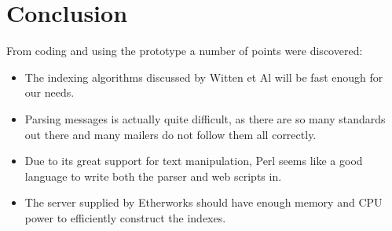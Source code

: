 \pagebreak
\enlargethispage*{0.5cm}
\section{Conclusion}
From coding and using the prototype a number of points were discovered:

\begin{itemize}
\item The indexing algorithms discussed by Witten et Al will be fast enough for our needs.
\item Parsing messages is actually quite difficult, as there are so many standards out there and many mailers do not follow them all correctly.
\item Due to its great support for text manipulation, Perl seems like a good language to write both the parser and web scripts in.
\item The server supplied by Etherworks should have enough memory and CPU power to efficiently construct the indexes.
\end{itemize}

